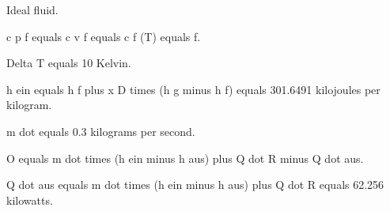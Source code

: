 Ideal fluid.

c p f equals c v f equals c f (T) equals f.

Delta T equals 10 Kelvin.

h ein equals h f plus x D times (h g minus h f) equals 301.6491 kilojoules per kilogram.

m dot equals 0.3 kilograms per second.

O equals m dot times (h ein minus h aus) plus Q dot R minus Q dot aus.

Q dot aus equals m dot times (h ein minus h aus) plus Q dot R equals 62.256 kilowatts.